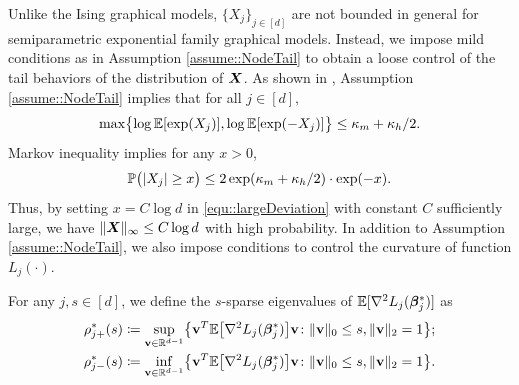 \documentclass[twoside,11pt]{article}
\newcommand*{\BR}{\mathbb{R}}
\newcommand*{\hessstarss}{\nabla^2 {L_j}(\bbeta^*_{j})}
\begin{document}
Unlike the Ising graphical models,  $\{ X_j\}_{j\in[d]}$ are not bounded in general for semiparametric exponential family graphical models. Instead, we impose mild conditions as in Assumption \ref{assume::NodeTail}  to obtain a loose control of the tail behaviors of the distribution of $\bm{X}$. As shown in  \cite{yang2013graphical}, Assumption \ref{assume::NodeTail} implies that for all $j\in[d],$ 
$$
\max\bigl\{ \log \mathbb{E} [\exp(X_j)  ] , \log \mathbb{E}  [\exp(- X_j) ] \bigr\} \leq \kappa_m + \kappa_h/2.
$$
Markov inequality implies for any $x>0$,  
\begin{align}\label{equ::largeDeviation}
\mathbb{P}\bigl(|X_j| \geq x \bigr) \leq   2 \exp( \kappa_m+ \kappa_h/2) \cdot \exp(-x).
\end{align}
Thus, by setting $x  =C \log d$ in \eqref{equ::largeDeviation} with constant $C$   sufficiently large, we have     $ \|\bm{X}\|_{\infty} \leq C\log d$  with high probability. In addition to  Assumption \ref{assume::NodeTail}, we also impose  conditions to control the curvature of function $L_j(\cdot).$ 

\begin{definition}\label{def::sparseEig}
For any $j, s \in[d]$,  we define the $s$-sparse eigenvalues  of $\EE [\hessstarss ]$  as
\begin{align*}
\rho_{j+}^* (s) &\coloneqq\sup\limits_{\vb\in \BR^{d-1}} \bigl\{\vb^T\EE\bigl[ \hessstarss\bigr]\vb \colon \| \vb\|_ 0 \leq s, \|\vb \|_2 = 1 \bigr\};\\
\rho_{j-}^*(s)& \coloneqq \inf\limits_{\vb\in \BR^{d-1}} \bigl\{\vb^T \EE\bigl[\hessstarss\bigr]\vb\colon \| \vb\|_ 0 \leq s, \|\vb \|_2 = 1\bigr\}.
\end{align*}
\end{definition}
\end{document}
